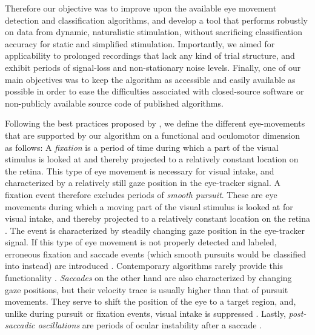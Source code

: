 Therefore our objective was to improve upon the available eye movement
detection and classification algorithms, and develop a tool that performs
robustly on data from dynamic, naturalistic stimulation, without sacrificing classification
accuracy for static and simplified stimulation. Importantly, we aimed for
applicability to prolonged recordings that lack any kind of trial structure,
and exhibit periods of signal-loss and non-stationary noise levels.
Finally, one of our main objectives was to keep the algorithm as accessible
and easily available as possible in order to ease the difficulties associated
with closed-source software or non-publicly available source code of published
algorithms.

Following the best practices proposed by \citet{hessels2018eye},
we define the different eye-movements that are supported by our algorithm
on a functional and oculomotor dimension as follows:
A \textit{fixation} is a period of time during which a part of the visual stimulus
is looked at and thereby projected to a relatively constant location on the retina.
This type of eye movement is necessary for visual intake, and characterized by a
relatively still gaze position in the eye-tracker signal.
A fixation event therefore excludes periods of \textit{smooth pursuit}.
These are eye movements during which a moving part of the visual stimulus is
looked at for visual intake, and thereby projected to a relatively constant
location on the retina \citep{carl1987pursuits}.
The event is characterized by steadily changing gaze position in the eye-tracker
signal. If this type of eye movement is not properly detected and labeled,
erroneous fixation and saccade events (which smooth pursuits would be classified into
instead) are introduced \citep{Andersson2017}. Contemporary algorithms rarely provide
this functionality \cite[but see \eg][for existing algorithms with
smooth pursuit classification]{LARSSON2015145,Komogortsev2013}.
\textit{Saccades} on the other hand are also characterized by changing gaze positions,
but their velocity trace is usually higher than that of pursuit movements.
They serve to shift the position of the eye to a target region, and, unlike
during pursuit or fixation events, visual intake
is suppressed \citep{Schutz2011}. Lastly, \textit{post-saccadic oscillations} are periods of
ocular instability after a saccade \citep{Nystrom2010AnData}.

